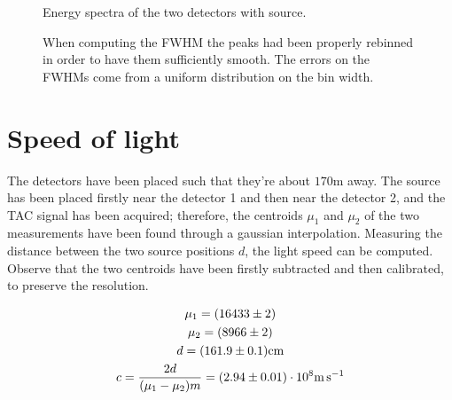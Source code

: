 \documentclass[11pt,a4 paper]{article}
\let\oldfrac\frac
\renewcommand{\frac}[3][d]{\ifthenelse{\equal{#1}{d}}{\oldfrac{#2}{#3}}{\nicefrac{#2}{#3}}}
\begin{document}
\begin{figure}[H]
    \centering
    \caption{Energy spectra of the two detectors with  source.}
    \label{fig:Co:spectra}
\end{figure}

\begin{figure}[H]
    \centering
    \caption{When computing the FWHM the peaks had been properly rebinned in order to have them sufficiently smooth. The errors on the FWHMs come from a uniform distribution on the bin width.}
    \label{fig:Co:results}
\end{figure}

\section{Speed of light}
The detectors have been placed such that they're about $170\si{\metre}$ away. The source has been placed firstly near the detector 1 and then near the detector 2, and the TAC signal has been acquired; therefore, the centroids $\mu_1$ and $\mu_2$ of the two measurements have been found through a gaussian interpolation. Measuring the distance between the two source positions $d$, the light speed can be computed. Observe that the two centroids have been firstly subtracted and then calibrated, to preserve the resolution.

\begin{gather*}
    \mu_1 = (16433 \pm 2) \\
    \mu_2 = (8966 \pm 2) \\
    d = (161.9 \pm 0.1) \si{\centi\metre} \\
    c = \frac{2d}{(\mu_1-\mu_2)m} = (2.94 \pm 0.01 )\cdot 10^8 \si{\metre\per\second}
\end{gather*}
\end{document}
